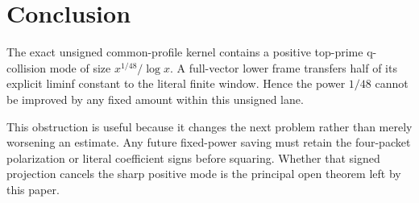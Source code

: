 \section{Conclusion}

The exact unsigned common-profile kernel contains a positive top-prime
q-collision mode of size $x^{1/48}/\log x$.  A full-vector lower frame transfers
half of its explicit liminf constant to the literal finite window.  Hence the
power $1/48$ cannot be improved by any fixed amount within this unsigned lane.

This obstruction is useful because it changes the next problem rather than
merely worsening an estimate.  Any future fixed-power saving must retain the
four-packet polarization or literal coefficient signs before squaring.  Whether
that signed projection cancels the sharp positive mode is the principal open
theorem left by this paper.
